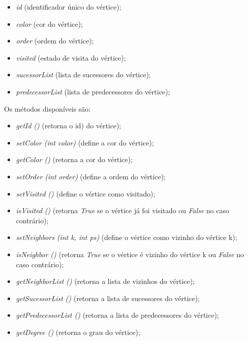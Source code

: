 \documentclass[a4paper,12pt]{report}
\begin{document}
\begin{itemize}
    \begin{itemize}
        \item \textit{id} (identificador único do vértice);
        \item \textit{color} (cor do vértice);
        \item \textit{order} (ordem do vértice);
        \item \textit{visited} (estado de visita do vértice);
        \item \textit{sucessorList} (lista de sucessores do vértice);
        \item \textit{predecessorList} (lista de predecessores do vértice);
    \end{itemize}
    Os métodos disponíveis são:
    \begin{itemize}
        \item \textit{getId ()} (retorna o id) do vértice);
        \item \textit{setColor (int color)} (define a cor do vértice);
        \item \textit{getColor ()} (retorna a cor do vértice);
        \item \textit{setOrder (int order)} (define a ordem do vértice);
        \item \textit{setVisited ()} (define o vértice como visitado);
        \item \textit{isVisited ()} (retorna \textit{True} se o vértice já foi visitado ou \textit{False} no caso contrário);
        \item \textit{setNeighbors (int k, int ps)} (define o vértice como vizinho do vértice k);
        \item \textit{isNeighbor ()} (retorna \textit{True} se o vértice é vizinho do vértice k ou \textit{False} no caso contrário);
        \item \textit{getNeighborList ()} (retorna a lista de vizinhos do vértice);
        \item \textit{getSucessorList ()} (retorna a lista de sucessores do vértice);
        \item \textit{getPredecessorList ()} (retorna a lista de predecessores do vértice);
        \item \textit{getDegree ()} (retorna o grau do vértice);
    \end{itemize}
\end{itemize}
\end{document}

